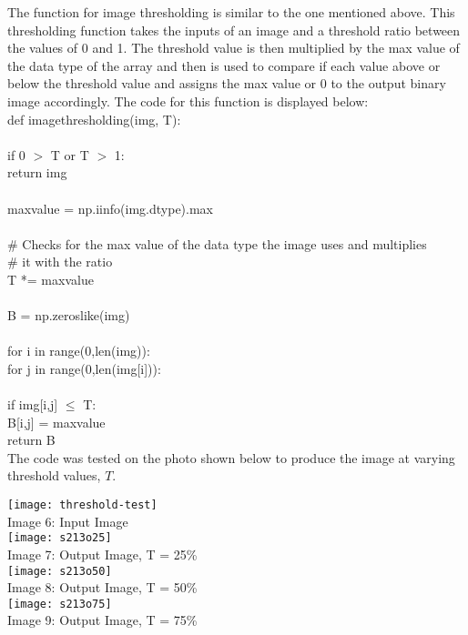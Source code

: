 \documentclass{article}
\begin{document}
	The function for image thresholding is similar to the one mentioned above. This thresholding function takes the inputs of an image and a threshold ratio between the values of 0 and 1. The threshold value is then multiplied by the max value of the data type of the array and then is used to compare if each value above or below the threshold value and assigns the max value or 0 to the output binary image accordingly. The code for this function is displayed below:\\
	
	\noindent def image\textunderscore thresholding(img, T):\\
	\\
	\indent if 0 $>$ T or T $>$ 1:\\
	\indent \indent return img\\
	\\
	\indent max\textunderscore value = np.iinfo(img.dtype).max\\
	\\
	\indent \# Checks for the max value of the data type the image uses and multiplies\\
	\indent \# it with the ratio\\
	\indent T *= max\textunderscore value\\
	\\
	\indent B = np.zeros\textunderscore like(img)\\
	\\
	\indent for i in range(0,len(img)):\\
	\indent \indent for j in range(0,len(img[i])):\\
	\\
	\indent \indent \indent if img[i,j] $\leq$ T:\\
	\indent \indent \indent\indent 	B[i,j] = max\textunderscore value\\
	\indent return B\\
	
	The code was tested on the photo shown below to produce the image at varying threshold values, $T$.\\
	
	\begin{center}
		\noindent \texttt{[image: threshold-test]}\\
		Image 6: Input Image\\
		
		\texttt{[image: s213o25]}\\
		Image 7: Output Image, T = 25\% \\
		
		\texttt{[image: s213o50]}\\
		Image 8: Output Image, T = 50\% \\
		
		\texttt{[image: s213o75]}\\
		Image 9: Output Image, T = 75\% \\

	\end{center}
	
\end{document}
